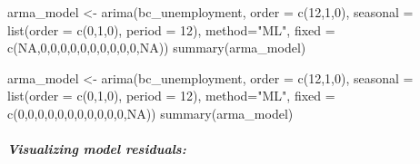 \documentclass[
  letterpaper,
  DIV=11,
  numbers=noendperiod]{scrartcl}
\let\oldsubparagraph\subparagraph
\renewcommand{\subparagraph}[1]{\oldsubparagraph{#1}\mbox{}}
\newenvironment{Shaded}{\begin{snugshade}}{\end{snugshade}}
\newcommand{\AttributeTok}[1]{\textcolor[rgb]{0.40,0.45,0.13}{#1}}
\newcommand{\ConstantTok}[1]{\textcolor[rgb]{0.56,0.35,0.01}{#1}}
\newcommand{\DecValTok}[1]{\textcolor[rgb]{0.68,0.00,0.00}{#1}}
\newcommand{\FunctionTok}[1]{\textcolor[rgb]{0.28,0.35,0.67}{#1}}
\newcommand{\NormalTok}[1]{\textcolor[rgb]{0.00,0.23,0.31}{#1}}
\newcommand{\OtherTok}[1]{\textcolor[rgb]{0.00,0.23,0.31}{#1}}
\newcommand{\StringTok}[1]{\textcolor[rgb]{0.13,0.47,0.30}{#1}}
\begin{document}
\begin{Shaded}
\begin{Highlighting}[]
\NormalTok{arma\_model }\OtherTok{\textless{}{-}} \FunctionTok{arima}\NormalTok{(bc\_unemployment, }\AttributeTok{order =} \FunctionTok{c}\NormalTok{(}\DecValTok{12}\NormalTok{,}\DecValTok{1}\NormalTok{,}\DecValTok{0}\NormalTok{), }\AttributeTok{seasonal =} \FunctionTok{list}\NormalTok{(}\AttributeTok{order =} \FunctionTok{c}\NormalTok{(}\DecValTok{0}\NormalTok{,}\DecValTok{1}\NormalTok{,}\DecValTok{0}\NormalTok{), }\AttributeTok{period =} \DecValTok{12}\NormalTok{), }\AttributeTok{method=}\StringTok{"ML"}\NormalTok{, }\AttributeTok{fixed =} \FunctionTok{c}\NormalTok{(}\ConstantTok{NA}\NormalTok{,}\DecValTok{0}\NormalTok{,}\DecValTok{0}\NormalTok{,}\DecValTok{0}\NormalTok{,}\DecValTok{0}\NormalTok{,}\DecValTok{0}\NormalTok{,}\DecValTok{0}\NormalTok{,}\DecValTok{0}\NormalTok{,}\DecValTok{0}\NormalTok{,}\DecValTok{0}\NormalTok{,}\DecValTok{0}\NormalTok{,}\ConstantTok{NA}\NormalTok{))}
\FunctionTok{summary}\NormalTok{(arma\_model)}

\NormalTok{arma\_model }\OtherTok{\textless{}{-}} \FunctionTok{arima}\NormalTok{(bc\_unemployment, }\AttributeTok{order =} \FunctionTok{c}\NormalTok{(}\DecValTok{12}\NormalTok{,}\DecValTok{1}\NormalTok{,}\DecValTok{0}\NormalTok{), }\AttributeTok{seasonal =} \FunctionTok{list}\NormalTok{(}\AttributeTok{order =} \FunctionTok{c}\NormalTok{(}\DecValTok{0}\NormalTok{,}\DecValTok{1}\NormalTok{,}\DecValTok{0}\NormalTok{), }\AttributeTok{period =} \DecValTok{12}\NormalTok{), }\AttributeTok{method=}\StringTok{"ML"}\NormalTok{, }\AttributeTok{fixed =} \FunctionTok{c}\NormalTok{(}\DecValTok{0}\NormalTok{,}\DecValTok{0}\NormalTok{,}\DecValTok{0}\NormalTok{,}\DecValTok{0}\NormalTok{,}\DecValTok{0}\NormalTok{,}\DecValTok{0}\NormalTok{,}\DecValTok{0}\NormalTok{,}\DecValTok{0}\NormalTok{,}\DecValTok{0}\NormalTok{,}\DecValTok{0}\NormalTok{,}\DecValTok{0}\NormalTok{,}\ConstantTok{NA}\NormalTok{))}
\FunctionTok{summary}\NormalTok{(arma\_model)}
\end{Highlighting}
\end{Shaded}

\hypertarget{visualizing-model-residuals}{%
\subparagraph{Visualizing model
residuals:}\label{visualizing-model-residuals}}
\end{document}

